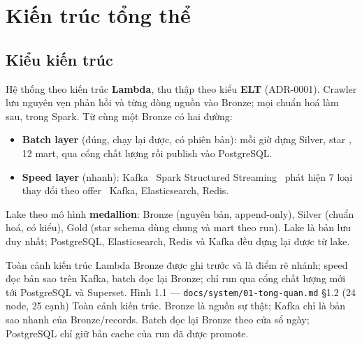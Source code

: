 \chapter{Kiến trúc tổng thể}\label{chap:arch}

\section{Kiểu kiến trúc}
Hệ thống theo kiến trúc \textbf{Lambda}, thu thập theo kiểu \textbf{ELT} (ADR-0001). Crawler lưu nguyên vẹn phản hồi
và từng dòng nguồn vào Bronze; mọi chuẩn hoá làm sau, trong Spark. Từ cùng một Bronze có hai đường:

\begin{itemize}
  \item \textbf{Batch layer} (đúng, chạy lại được, có phiên bản): mỗi giờ dựng Silver, star , 12 mart,
        qua cổng chất lượng rồi publish vào PostgreSQL.
  \item \textbf{Speed layer} (nhanh): Kafka \ra\ Spark Structured Streaming \ra\ phát hiện 7 loại thay đổi theo offer
        \ra\ Kafka, Elasticsearch, Redis.
\end{itemize}

Lake theo mô hình \textbf{medallion}: Bronze (nguyên bản, append-only), Silver (chuẩn hoá, có kiểu),
Gold (star schema dùng chung và mart theo run). Lake là bản lưu duy nhất; PostgreSQL, Elasticsearch, Redis
và Kafka đều dựng lại được từ lake.

  {Toàn cảnh kiến trúc Lambda}
  {Bronze được ghi trước và là điểm rẽ nhánh; speed đọc bản sao trên Kafka, batch đọc lại Bronze; chỉ run qua cổng chất lượng mới tới PostgreSQL và Superset.}
  {Hình 1.1 — \texttt{docs/system/01-tong-quan.md} §1.2 (24 node, 25 cạnh)}
  {Toàn cảnh kiến trúc. Bronze là nguồn sự thật; Kafka chỉ là bản sao nhanh của Bronze/records. Batch đọc lại Bronze theo cửa sổ ngày; PostgreSQL chỉ giữ bản cache của run đã được promote.}

